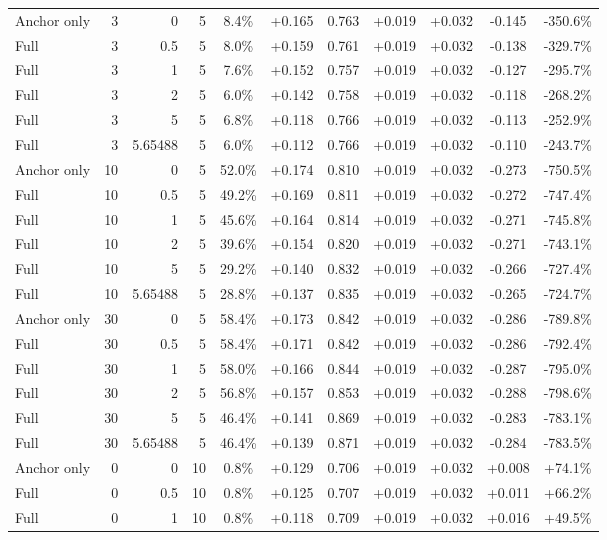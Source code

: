 \begin{table}[htbp]
\begin{tabular}{lrrrccccccc}
Anchor only & 3 & 0 & 5 & 8.4\% & +0.165 & 0.763 & +0.019 & +0.032 & -0.145 & -350.6\% \\
Full & 3 & 0.5 & 5 & 8.0\% & +0.159 & 0.761 & +0.019 & +0.032 & -0.138 & -329.7\% \\
Full & 3 & 1 & 5 & 7.6\% & +0.152 & 0.757 & +0.019 & +0.032 & -0.127 & -295.7\% \\
Full & 3 & 2 & 5 & 6.0\% & +0.142 & 0.758 & +0.019 & +0.032 & -0.118 & -268.2\% \\
Full & 3 & 5 & 5 & 6.8\% & +0.118 & 0.766 & +0.019 & +0.032 & -0.113 & -252.9\% \\
Full & 3 & 5.65488 & 5 & 6.0\% & +0.112 & 0.766 & +0.019 & +0.032 & -0.110 & -243.7\% \\
Anchor only & 10 & 0 & 5 & 52.0\% & +0.174 & 0.810 & +0.019 & +0.032 & -0.273 & -750.5\% \\
Full & 10 & 0.5 & 5 & 49.2\% & +0.169 & 0.811 & +0.019 & +0.032 & -0.272 & -747.4\% \\
Full & 10 & 1 & 5 & 45.6\% & +0.164 & 0.814 & +0.019 & +0.032 & -0.271 & -745.8\% \\
Full & 10 & 2 & 5 & 39.6\% & +0.154 & 0.820 & +0.019 & +0.032 & -0.271 & -743.1\% \\
Full & 10 & 5 & 5 & 29.2\% & +0.140 & 0.832 & +0.019 & +0.032 & -0.266 & -727.4\% \\
Full & 10 & 5.65488 & 5 & 28.8\% & +0.137 & 0.835 & +0.019 & +0.032 & -0.265 & -724.7\% \\
Anchor only & 30 & 0 & 5 & 58.4\% & +0.173 & 0.842 & +0.019 & +0.032 & -0.286 & -789.8\% \\
Full & 30 & 0.5 & 5 & 58.4\% & +0.171 & 0.842 & +0.019 & +0.032 & -0.286 & -792.4\% \\
Full & 30 & 1 & 5 & 58.0\% & +0.166 & 0.844 & +0.019 & +0.032 & -0.287 & -795.0\% \\
Full & 30 & 2 & 5 & 56.8\% & +0.157 & 0.853 & +0.019 & +0.032 & -0.288 & -798.6\% \\
Full & 30 & 5 & 5 & 46.4\% & +0.141 & 0.869 & +0.019 & +0.032 & -0.283 & -783.1\% \\
Full & 30 & 5.65488 & 5 & 46.4\% & +0.139 & 0.871 & +0.019 & +0.032 & -0.284 & -783.5\% \\
Anchor only & 0 & 0 & 10 & 0.8\% & +0.129 & 0.706 & +0.019 & +0.032 & +0.008 & +74.1\% \\
Full & 0 & 0.5 & 10 & 0.8\% & +0.125 & 0.707 & +0.019 & +0.032 & +0.011 & +66.2\% \\
Full & 0 & 1 & 10 & 0.8\% & +0.118 & 0.709 & +0.019 & +0.032 & +0.016 & +49.5\% \\

\end{tabular}
\end{table}
